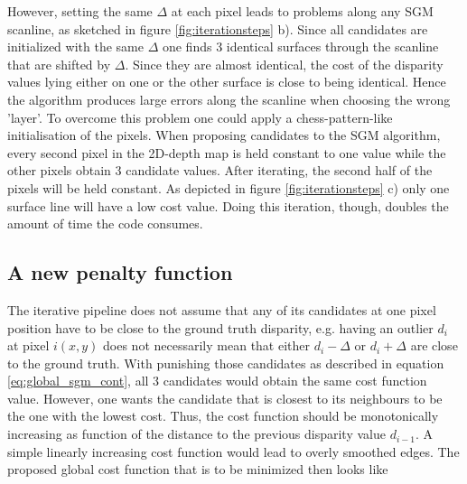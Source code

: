 \documentclass  [
  paper    = a4,
  BCOR     = 10mm,
  twoside,
  fontsize = 12pt,
  fleqn,
  toc      = bibnumbered,
  toc      = listofnumbered,
  numbers  = noendperiod,
  headings = normal,
  listof   = leveldown,
  version  = 3.03
]                                       {scrreprt}
\begin{document}
However, setting the same $\Delta$ at each pixel leads to problems along any SGM scanline, as sketched in figure \ref{fig:iterationsteps} b). Since all candidates are initialized with the same $\Delta$ one finds 3 identical surfaces through the scanline that are shifted by $\Delta$. Since they are almost identical, the cost of the disparity values lying either on one or the other surface is close to being identical. Hence the algorithm produces large errors along the scanline when choosing the wrong 'layer'. To overcome this problem one could apply a chess-pattern-like initialisation of the pixels. When proposing candidates to the SGM algorithm, every second pixel in the 2D-depth map is held constant to one value while the other pixels obtain 3 candidate values. After iterating, the second half of the pixels will be held constant. As depicted in figure \ref{fig:iterationsteps} c) only one surface line will have a low cost value. Doing this iteration, though, doubles the amount of time the code consumes. 
\subsection{A new penalty function} 
The iterative pipeline does not assume that any of its candidates at one pixel position have to be close to the ground truth disparity, e.g. having an outlier $d_i$ at pixel $i(x,y)$ does not necessarily mean that either $d_i-\Delta$ or $d_i+\Delta$ are close to the ground truth. With punishing those candidates as described in equation \ref{eq:global_sgm_cont}, all 3 candidates would obtain the same cost function value. However, one wants the candidate that is closest to its neighbours to be the one with the lowest cost. Thus, the cost function should be monotonically increasing as function of the distance to the previous disparity value $d_{i-1}$. A simple linearly increasing cost function would lead to overly smoothed edges. The proposed global cost function that is to be minimized then looks like
\end{document}
